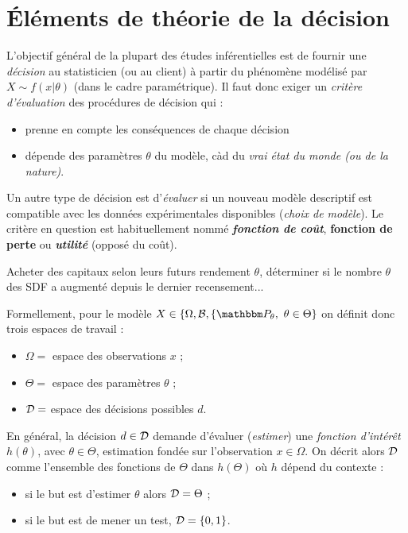 \section{\'Eléments de théorie de la décision}\label{decision}

L'objectif général de la plupart des études inférentielles est de fournir une \emph{décision} au statisticien (ou au client)
à partir du phénomène modélisé par $X\sim f(x|\theta)$ {(dans le cadre paramétrique)}. Il faut donc exiger un \emph{critère d'évaluation} des procédures de décision qui :
\begin{itemize}
\item prenne en compte les conséquences de chaque décision
\item dépende des paramètres $\theta$ du modèle, càd du \emph{vrai état du monde (ou de la nature)}.
\end{itemize}
 Un autre type de décision est d'{\it évaluer} si un nouveau modèle descriptif est compatible avec les données expérimentales disponibles (\emph{choix de modèle}). Le critère en question est habituellement nommé \emph{\bf fonction de co\^ut}, {\bf fonction de perte} ou \emph{\bf utilité} (opposé du co\^ut). \\

\begin{exo}
Acheter des capitaux selon leurs futurs rendement $\theta$, déterminer si le nombre $\theta$ des SDF a augmenté depuis le dernier recensement... \\
\end{exo}


 
 Formellement, pour le modèle $X\in\{\Omega,{\cal{B}},\{\Pp_{\theta}, \ \theta\in\Theta\}$ on définit donc trois espaces de travail :
 \begin{itemize}
\item $\Omega=$ espace des observations $x$ ;
\item $\Theta=$ espace des paramètres $\theta$ ;
\item ${\cal{D}}=$ espace des décisions possibles $d$.
\end{itemize}
En général, la décision $d\in{\cal{D}}$ demande d'évaluer ({\it estimer}) une  \emph{fonction d'intér\^et} $h(\theta)$, avec $\theta\in\Theta$, estimation fondée sur l'observation $x\in\Omega$. On décrit alors ${\cal{D}}$ comme l'ensemble des fonctions de $\Theta$ dans $h(\Theta)$ où $h$ dépend du contexte :
\begin{itemize}
\item si le but est d'estimer $\theta$ alors ${\cal{D}}=\Theta$ ;
\item si le but est de mener un test, ${\cal{D}}=\{0,1\}$.
\end{itemize}

